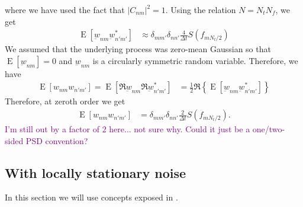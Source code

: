 \documentclass{article}
\begin{document}
where we have used the fact that $|C_{n m}|^{2} = 1$. Using the relation $N = N_{t}N_{f}$, we get
\begin{align}
\label{eq:covariance_order_0_diag2}
    \operatorname{E}\left[\underbar{w}_{nm} \underbar{w}_{n'm'}^{\ast}\right] & \approx \delta_{m m'} \delta_{n n'} \frac{4}{\Delta t} S(f_{mN_{t}/2})  
\end{align}
We assumed that the underlying process was zero-mean Gaussian so that $\operatorname{E}[\underbar{w}_{nm}] = 0$ and $\underbar{w}_{nm}$ is a circularly symmetric random variable. Therefore, we have 
\begin{align}
   \operatorname{E}\left[w_{nm} w_{n'm'}\right] =  \operatorname{E}\left[\Re \underbar{w}_{nm} \Re \underbar{w}_{n'm'}^{\ast}\right] & = \frac{1}{2} \Re \left\{ \operatorname{E}\left[\underbar{w}_{nm} \underbar{w}_{n'm'}^{\ast}\right] \right\}
\end{align}
Therefore, at zeroth order we get 
\begin{align}
\label{eq:covariance_wnm}
   \operatorname{E}\left[w_{nm} w_{n'm'}\right] & =  \delta_{m m'} \delta_{n n'}  \frac{2}{\Delta t}  S\left(f_{m N_t / 2}\right).
\end{align}
\textcolor{purple}{I'm still out by a factor of $2$ here... not sure why. Could it just be a one/two-sided PSD convention?} 


\subsection{With locally stationary noise}\label{sec:locally_statioanry}

In this section we will use concepts exposed in \cite{mallat_adaptive_1998}.
\end{document}

